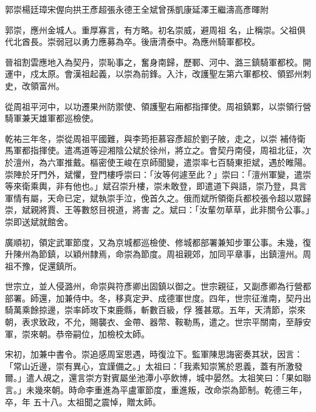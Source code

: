 
\begin{pinyinscope}

 郭崇楊廷璋宋偓向拱王彥超張永德王全斌曾孫凱康延澤王繼濤高彥暉附



 郭崇，應州金城人。重厚寡言，有方略。初名崇威，避周祖
 名，止稱崇。父祖俱代北酋長。崇弱冠以勇力應募為卒。後唐清泰中。為應州騎軍都校。



 晉祖割雲應地入為契丹，崇恥事之，奮身南歸，歷鄆、河中、潞三鎮騎軍都校。開運中，戍太原。會漢祖起義，以崇為前鋒。入汴，改護聖左第六軍都校、領郢州刺史，改領富州。



 從周祖平河中，以功遷果州防禦使、領護聖右廂都指揮使。周祖鎮鄴，以崇領行營騎軍兼天雄軍都巡檢使。



 乾祐三年冬，崇從周祖平國難，與李筠拒慕容彥超於劉子陂，走之，以崇
 補侍衛馬軍都指揮使。遣馮道等迎湘陰公斌於徐州，將立之。會契丹南侵，周祖北征，次於澶州，為六軍推戴。樞密使王峻在京師聞變，遣崇率七百騎東拒斌，遇於睢陽。崇陣於牙門外，斌懼，登門樓呼崇曰：「汝等何遽至此？」崇曰：「澶州軍變，遣崇等來衛乘輿，非有他也。」斌召崇升樓，崇未敢登，即遣道下與語，崇乃登，具言軍情有屬，天命已定，斌執崇手泣，俛首久之。俄而斌所領衛兵都校張令超以眾歸崇，斌親將賈、王等數怒目視道，將害
 之。斌曰：「汝輩勿草草，此非關令公事。」崇即送斌就館舍。



 廣順初，領定武軍節度，又為京城都巡檢使、修城都部署兼知步軍公事。未幾，復升陳州為節鎮，以穎州隸焉，命崇為節度。周祖親郊，加同平章事，出鎮澶州。周祖不豫，促還鎮所。



 世宗立，並人侵潞州，命崇與符彥卿出固鎮以御之。世宗親征，又副彥卿為行營都部署。師還，加兼侍中。冬，移真定尹、成德軍世度。四年，世宗征淮南，契丹出騎萬乘餘掠邊，崇率師攻下束鹿縣，斬數百級，俘
 獲甚眾。五年，天清節，崇來朝，表求致政，不允，賜襲衣、金帶、器幣、鞍勒馬，遣之。世宗平關南，至靜安軍，崇來朝。恭帝嗣位，加檢校太師。



 宋初，加兼中書令。崇追感周室恩遇，時復泣下。監軍陳思誨密奏其狀，因言：「常山近邊，崇有異心，宜謹備之。」太祖曰：「我素知崇篤於恩義，蓋有所激發爾。」遣人覘之，還言崇方對賓屬坐池潭小亭飲博，城中晏然。太祖笑曰：「果如聯言。」未幾來朝。時命李重進為平盧軍節度，重進叛，改命崇為節制。乾德三年，卒，年
 五十八。太祖聞之震悼，贈太師。




\end{pinyinscope}
